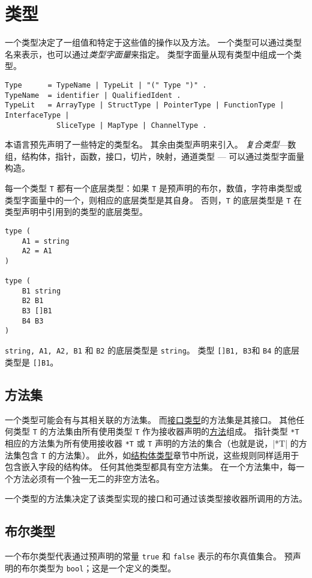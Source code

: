 \chapter{类型}
一个类型决定了一组值和特定于这些值的操作以及方法。
一个类型可以通过类型名来表示，也可以通过\emph{类型字面量}来指定。
类型字面量从现有类型中组成一个类型。

\begin{lstlisting}[style=EBNF]
Type      = TypeName | TypeLit | "(" Type ")" .
TypeName  = identifier | QualifiedIdent .
TypeLit   = ArrayType | StructType | PointerType | FunctionType | InterfaceType |
			SliceType | MapType | ChannelType .
\end{lstlisting}

本语言预先声明了一些特定的类型名。
其余由类型声明来引入。
\emph{复合类型}---数组，结构体，指针，函数，接口，切片，映射，通道类型 --- 可以通过类型字面量构造。

每一个类型 \lstinline|T| 都有一个底层类型：如果 \lstinline|T| 是预声明的布尔，数值，字符串类型或类型字面量中的一个，则相应的底层类型是其自身。
否则，\lstinline|T| 的底层类型是 \lstinline|T| 在类型声明中引用到的类型的底层类型。
\begin{lstlisting}[style=golang]
type (
	A1 = string
	A2 = A1
)

type (
	B1 string
	B2 B1
	B3 []B1
	B4 B3
)
\end{lstlisting}
\lstinline|string, A1, A2, B1| 和 \lstinline|B2| 的底层类型是 \lstinline|string|。
类型 \lstinline|[]B1, B3|和 \lstinline|B4| 的底层类型是 \lstinline|[]B1|。


\section{方法集}
一个类型可能会有与其相关联的方法集。
而\hyperref[sec:interface types]{接口类型}的方法集是其接口。
其他任何类型 \lstinline|T| 的方法集由所有使用类型 \lstinline|T| 作为接收器声明的\hyperref[sec:method declarations]{方法}组成。
指针类型 \lstinline|*T| 相应的方法集为所有使用接收器 \lstinline|*T| 或 \lstinline|T| 声明的方法的集合（也就是说，\gocode|*T| 的方法集包含 \lstinline|T| 的方法集）。
此外，如\hyperref[sec:struct types]{结构体类型}章节中所说，这些规则同样适用于包含嵌入字段的结构体。
任何其他类型都具有空方法集。
在一个方法集中，每一个方法必须有一个独一无二的非空方法名。

一个类型的方法集决定了该类型实现的接口和可通过该类型接收器所调用的方法。

\section{布尔类型}
一个布尔类型代表通过预声明的常量 \lstinline|true| 和 \lstinline|false| 表示的布尔真值集合。
预声明的布尔类型为 \lstinline|bool|；这是一个定义的类型。

